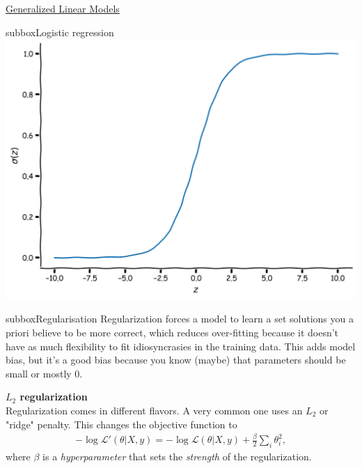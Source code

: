 \begin{textbox}{\href{https://compneuro.neuromatch.io/tutorials/W1D3_GeneralizedLinearModels/student/W1D3_Tutorial2.html}{Generalized Linear Models } }
\begin{subbox}{subbox}{Logistic regression}
\centering
\includegraphics[scale=0.07]{Figures/GLM/GLMFigure5.png}
\end{subbox}

\begin{subbox}{subbox}{Regularisation 
}
\scriptsize
Regularization forces a model to learn a set solutions you a priori believe to be more correct, which reduces over-fitting because it doesn't have as much flexibility to fit idiosyncrasies in the training data. This adds model bias, but it's a good bias because you know (maybe) that parameters should be small or mostly 0.

\textbf{$L_2$ regularization}\\
Regularization comes in different flavors. A very common one uses an $L_2$ or "ridge" penalty. This changes the objective function to
\begin{align}
-\log\mathcal{L}'(\theta | X, y)=
-\log\mathcal{L}(\theta | X, y) +\frac\beta2\sum_i\theta_i^2,
\end{align}
where $\beta$ is a \textit{hyperparameter} that sets the \textit{strength} of the regularization.

\end{subbox}

\end{textbox}